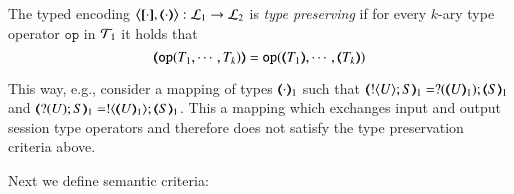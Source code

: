 \begin{definition}
	\label{def:tp}
	The typed encoding 
	$\enco{\map{\cdot}, \mapt{\cdot}}: \tyl{L}_1 \to \tyl{L}_2$ is \emph{type preserving}
	if for every $k$-ary type operator $\mathtt{op}$ in ${\cal{T}}_1$ it holds that 
	 $$\mapt{\mathtt{op}(T_1, \cdots, T_k)} = \mathtt{op}(\mapt{T_1}, \cdots, \mapt{T_k})$$
	\end{definition}
This way, e.g., 
consider a mapping of types $(\!\!\langle\cdot\rangle\!\!)_1$ such that 
$\mapt{\btout{U} S}_1 = \btinp{\mapt{U}_1} \mapt{S}_1$ 
and 
$\mapt{\btinp{U} S}_1 = \btout{\mapt{U}_1} \mapt{S}_1$. This a mapping which exchanges
input and output session type operators and therefore does not
satisfy the type preservation criteria above. %

Next we define semantic criteria: %


